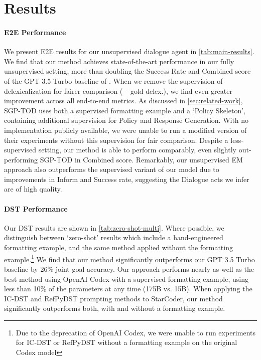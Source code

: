 \documentclass[11pt]{article}
\begin{document}
\section{Results}
\label{sec:results}
\paragraph{E2E Performance} 
We present E2E results for our unsupervised dialogue agent in \autoref{tab:main-results}. 
We find that our method achieves state-of-the-art performance in our fully unsupervised setting, more than doubling the Success Rate and Combined score of the GPT 3.5 Turbo baseline of \citet{hudecek-dusek-2023-large}.
When we remove the supervision of delexicalization for fairer comparison ($-$ gold delex.), we find even greater improvement across all end-to-end metrics.
As discussed in \autoref{sec:related-work}, SGP-TOD uses both a supervised formatting example and a `Policy Skeleton', containing additional supervision for Policy and Response Generation.
With no implementation publicly available, we were unable to run a modified version of their experiments without this supervision for fair comparison. 
Despite a less-supervised setting, our method is able to perform comparably, even slightly out-performing SGP-TOD in Combined score.
Remarkably, our unsupervised EM approach also outperforms the supervised variant of our model due to improvements in Inform and Success rate, suggesting the Dialogue acts we infer are of high quality. 
\paragraph{DST Performance} Our DST results are shown in \autoref{tab:zero-shot-multi}. Where possible, we distinguish between `zero-shot' results which include a hand-engineered formatting example, and the same method applied without the formatting example.\footnote{Due to the deprecation of OpenAI Codex, we were unable to run experiments for IC-DST or RefPyDST without a formatting example on the original Codex model}
We find that our method significantly outperforms our GPT 3.5 Turbo baseline by 26\% joint goal accuracy. 
Our approach performs nearly as well as the best method using OpenAI Codex with a supervised formatting example, using less than 10\% of the parameters at any time (175B vs. 15B). 
When applying the IC-DST and RefPyDST prompting methods to StarCoder, our method significantly outperforms both, with and without a formatting example.
\end{document}
